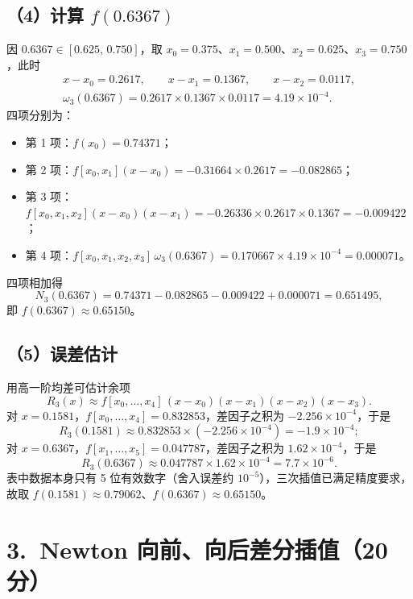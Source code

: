 \documentclass[a4paper,11pt]{ctexart}
\begin{document}
\subsection*{（4）计算 $f(0.6367)$}
因 $0.6367\in[0.625,\,0.750]$，取 $x_0=0.375$、$x_1=0.500$、$x_2=0.625$、$x_3=0.750$，此时
\begin{gather*}
  x-x_0=0.2617,\qquad x-x_1=0.1367,\qquad x-x_2=0.0117 ,\\
  \omega_3(0.6367)=0.2617\times0.1367\times0.0117=4.19\times 10^{-4}.
\end{gather*}
四项分别为：
\begin{itemize}\setlength{\itemsep}{0.15em}
  \item[] 第 1 项：$f(x_0)=0.74371$；
  \item[] 第 2 项：$f[x_0,x_1](x-x_0)=-0.31664\times0.2617=-0.082865$；
  \item[] 第 3 项：$f[x_0,x_1,x_2](x-x_0)(x-x_1)
        =-0.26336\times0.2617\times0.1367=-0.009422$；
  \item[] 第 4 项：$f[x_0,x_1,x_2,x_3]\,\omega_3(0.6367)
        =0.170667\times4.19\times10^{-4}=0.000071$。
\end{itemize}
四项相加得
\[
  N_3(0.6367)=0.74371-0.082865-0.009422+0.000071=0.651495 ,
\]
即 $f(0.6367)\approx 0.65150$。

\subsection*{（5）误差估计}
用高一阶均差可估计余项
\[
  R_3(x)\approx f[x_0,\ldots,x_4]\,(x-x_0)(x-x_1)(x-x_2)(x-x_3).
\]
对 $x=0.1581$，$f[x_0,\ldots,x_4]=0.832853$，差因子之积为 $-2.256\times10^{-4}$，于是
\[
  R_3(0.1581)\approx 0.832853\times(-2.256\times10^{-4})=-1.9\times 10^{-4};
\]
对 $x=0.6367$，$f[x_1,\ldots,x_5]=0.047787$，差因子之积为 $1.62\times10^{-4}$，于是
\[
  R_3(0.6367)\approx 0.047787\times 1.62\times10^{-4}=7.7\times 10^{-6}.
\]
表中数据本身只有 5 位有效数字（舍入误差约 $10^{-5}$），三次插值已满足精度要求，
故取 $f(0.1581)\approx 0.79062$、$f(0.6367)\approx 0.65150$。

\section*{3.\ Newton 向前、向后差分插值（20分）}
\end{document}
